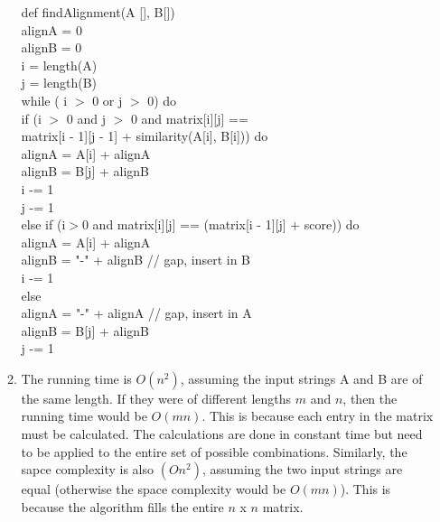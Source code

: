 \documentclass{article}
\newcommand\tab[1][1cm]{\hspace*{#1}}
\begin{document}
\begin{enumerate}
\begin{enumerate}
        def findAlignment(A [], B[])\\
        \tab alignA = 0\\
        \tab alignB = 0\\
        \tab i = length(A)\\
        \tab j = length(B)\\
        \tab while ( i $>$ 0 or j $>$ 0) do\\
        \tab \tab if (i $>$ 0 and j $>$ 0 and matrix[i][j] ==\\ 
        \tab \tab matrix[i - 1][j - 1] + similarity(A[i], B[i])) do\\
        \tab \tab \tab alignA = A[i] + alignA \\
        \tab \tab \tab alignB = B[j] + alignB \\
        \tab \tab \tab i -= 1 \\
        \tab \tab \tab j -= 1 \\
        \tab \tab else if (i$>$0 and matrix[i][j] == (matrix[i - 1][j] + score)) do\\
        \tab \tab \tab alignA = A[i] + alignA \\
        \tab \tab \tab alignB = "-" + alignB // gap, insert in B \\
        \tab \tab \tab i -= 1\\
        \tab \tab else \\
        \tab \tab \tab alignA = "-" + alignA // gap, insert in A \\
        \tab \tab \tab alignB = B[j] + alignB \\
        \tab \tab \tab j -= 1\\

      \item The running time is $O(n^2)$, assuming the input strings A and B are of the same length. If they
        were of different lengths $m$ and $n$, then the running time would be $O(mn)$. This is because each
        entry in the matrix must be calculated. The calculations are done in constant time but need to be 
        applied to the entire set of possible combinations. Similarly, the sapce complexity is also $(On^2)$,
        assuming the two input strings are equal (otherwise the space complexity would be $O(mn)$). This is
        because the algorithm fills the entire $n$ x $n$ matrix.


    \end{enumerate}


\end{enumerate}
\end{document}
